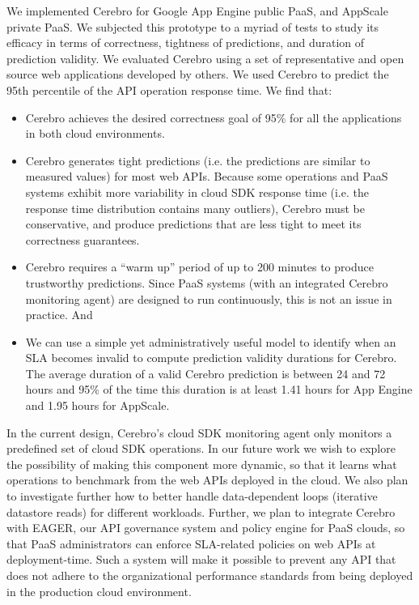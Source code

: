 We implemented Cerebro for Google App Engine public PaaS, 
and AppScale private PaaS. We subjected this
prototype to a myriad of tests to study its efficacy in terms of
correctness, tightness of predictions, and duration of prediction 
validity.  We evaluated Cerebro using a set of representative
and open source web applications developed by others.  We used Cerebro to
predict the 95th percentile of the API operation response time. 
We find that:
\begin{itemize}
\item Cerebro achieves the desired correctness goal of 95\% for all the applications in both cloud environments.
\item Cerebro generates tight predictions (i.e.
the predictions are similar to measured values) for most web APIs.  Because
some operations and PaaS systems exhibit more variability in cloud SDK response
time (i.e. the response time distribution contains many outliers), 
Cerebro must be conservative, and produce predictions that are less tight
to meet its correctness guarantees.  
\item Cerebro requires a ``warm up'' period of up to 200 minutes to produce trustworthy predictions. Since PaaS systems (with an integrated Cerebro monitoring agent) are designed to run continuously, this is not an issue in practice. And
\item We can use a simple yet administratively useful model to identify when an 
SLA becomes invalid to compute
prediction validity durations for Cerebro.  The average duration of a valid
Cerebro prediction is between 24 and 72 hours
and 95\% of the time this duration is at least 
1.41 hours for App Engine and 1.95 hours for AppScale.
\end{itemize}

In the current design, Cerebro's cloud SDK monitoring agent only monitors 
a predefined set of cloud SDK operations. In our future work we wish 
to explore the possibility of making this component more dynamic,
so that it learns what operations to benchmark from the web APIs 
deployed in the cloud. We also plan to investigate further how to better
handle data-dependent loops (iterative datastore reads) for different workloads. 
Further, we plan
to integrate Cerebro with EAGER, our API governance system 
and policy engine for PaaS clouds, so 
that PaaS administrators can enforce SLA-related policies on web APIs at deployment-time.
Such a system will make it possible to prevent any API that 
does not adhere to the organizational performance
standards from being deployed in the production cloud environment.

